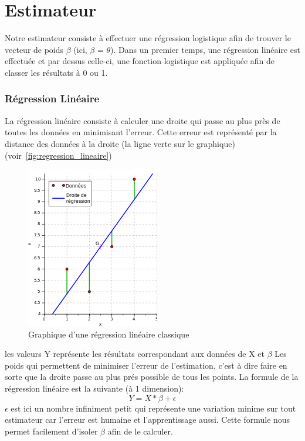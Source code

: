 \section{Estimateur}

Notre estimateur consiste à effectuer une régression logistique afin de trouver le vecteur de poids $\beta$ (ici, $\beta$ = $\theta$).
Dans un premier temps, une régression linéaire est effectuée et par dessus celle-ci, une fonction logistique est appliquée afin de classer les résultats à 0 ou 1. 

\subsubsection{Régression Linéaire}

La régression linéaire consiste à calculer une droite qui passe au plus près de toutes les données en minimisant l'erreur.
Cette erreur est représenté par la distance des données à la droite (la ligne verte sur le graphique)  (voir~\autoref{fig:regression_lineaire})

\begin{figure}[htpb]
	\centering
	\includegraphics[scale = 0.5]{images/regression_lineaire}
	\caption{Graphique d'une régression linéaire classique}
	\label{fig:regression_lineaire}
\end{figure}
 
les valeurs Y représente les résultats correspondant aux données de X et $\beta$ Les poids qui permettent de minimiser l'erreur de l'estimation, c'est à dire faire en sorte que la droite passe au plus prés possible de tous les points. 
La formule de la régression linéaire est la suivante (à 1 dimension): 
\begin{equation}
Y = X * \beta + \epsilon
\end{equation}
$\epsilon$ est ici un nombre infiniment petit qui représente une variation minime sur tout estimateur car l'erreur est humaine et l'apprentissage aussi. 
Cette formule nous permet facilement d'isoler $\beta$ afin de le calculer. 

